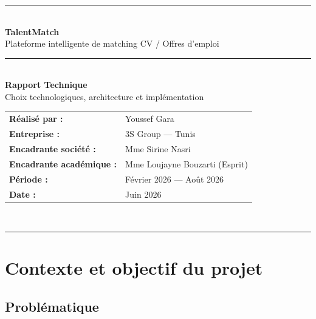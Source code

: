 \documentclass[12pt,a4paper]{report}
\begin{document}

\begin{titlepage}
\thispagestyle{empty}
\begin{center}
  \vspace*{1cm}
  {\color{navyblue}\rule{\textwidth}{2pt}}\\[0.5cm]
  {\Huge\bfseries\color{navyblue} TalentMatch}\\[0.3cm]
  {\Large Plateforme intelligente de matching CV / Offres d'emploi}\\[0.3cm]
  {\color{goldcolor}\rule{\textwidth}{1pt}}\\[1.5cm]

  {\LARGE\bfseries Rapport Technique}\\[0.4cm]
  {\large Choix technologiques, architecture et implémentation}\\[2cm]

  \begin{tabular}{ll}
    \textbf{Réalisé par :}     & Youssef Gara \\[4pt]
    \textbf{Entreprise :}      & 3S Group — Tunis \\[4pt]
    \textbf{Encadrante société :}  & Mme Sirine Nasri \\[4pt]
    \textbf{Encadrante académique :} & Mme Loujayne Bouzarti (Esprit) \\[4pt]
    \textbf{Période :}         & Février 2026 — Août 2026 \\[4pt]
    \textbf{Date :}            & Juin 2026 \\
  \end{tabular}\\[3cm]

  {\color{navyblue}\rule{\textwidth}{2pt}}
\end{center}
\end{titlepage}

\tableofcontents
\newpage

\chapter{Contexte et objectif du projet}

\section{Problématique}
\end{document}
